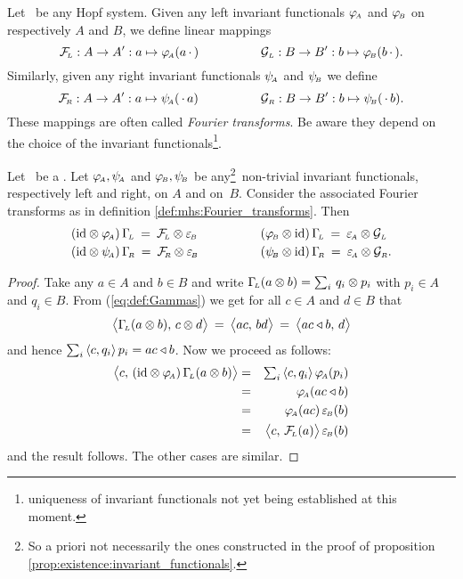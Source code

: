 \begin{defn_sec} \label{def:mhs:Fourier_transforms}
Let \pairAB\ be any Hopf system. Given any left invariant functionals
$\varphi_{\!\scriptscriptstyle A}$ and $\varphi_{\scriptscriptstyle \! B}$ on respectively $A$ and $B$, we define linear mappings
$$  \mathcal{F}_{\!\scriptscriptstyle L} : A \rightarrow A' :  a \mapsto \varphi_{\!\scriptscriptstyle A}(a\, \cdot \,)
        \hspace{5em}
    \mathcal{G}_{\scriptscriptstyle L} : B \rightarrow B' :  b \mapsto \varphi_{\scriptscriptstyle \! B}(b\, \cdot \,). $$
Similarly, given any right invariant functionals $\psi_{\!\scriptscriptstyle A}$ and $\psi_{\scriptscriptstyle \! B}$ we define
$$  \mathcal{F}_{\!\scriptscriptstyle R} : A \rightarrow A' :  a \mapsto \psi_{\!\scriptscriptstyle A}(\, \cdot \, a)
        \hspace{5em}
    \mathcal{G}_{\scriptscriptstyle R} : B \rightarrow B' :  b \mapsto \psi_{\scriptscriptstyle \! B}(\, \cdot \, b). $$
These mappings are often called {\em Fourier transforms}\@.
Be aware they depend on the choice of the invariant
functionals\footnote{uniqueness of invariant functionals not yet being
established at this moment.}.
\end{defn_sec}



\begin{lemma_sec} \label{lemma:mhs:Fourier_transforms}
Let\/ \pairAB\ be a \mhs\@. Let\/ $\varphi_{\!\scriptscriptstyle A}, \psi_{\!\scriptscriptstyle A}$ and\/ $\varphi_{\scriptscriptstyle \! B}, \psi_{\scriptscriptstyle \! B}$ be
any\footnote{So a priori not necessarily the ones constructed in
the proof of proposition \ref{prop:existence:invariant_functionals}.}\
non-trivial invariant functionals, respectively left and right, on $A$ and \mbox{on\/ $B$}\@.
Consider the associated Fourier transforms as in definition
\ref{def:mhs:Fourier_transforms}\@. Then
$$\begin{array}{lll}
    (\id \tens \phiA)\, \GamL \:=\: \FL \tens \epsB   & \hspace{3em} &
    (\phiB \tens \id)\, \GamL \:=\: \epsA \tens \GL
  \\
    (\id \tens \psiA)\, \GamR \:=\: \FR \tens \epsB   & \vertL &
    (\psiB \tens \id)\, \GamR \:=\: \epsA \tens \GR.
  \end{array}$$
\end{lemma_sec}

\begin{proof}
Take any $a \in A$ and $b\in B$ and write
$\Gamma_{\!\scriptscriptstyle L}(a \otimes b) = \sum_i \,q_i \otimes p_i$ with $p_i \in A$ and $q_i \in B$.
From (\ref{eq:def:Gammas}) we get for all $c \in A$ and $d\in B$ that
$$ \pairM{\GamL(a \tens b)}{c \tens d} \:=\: \pairM{ac}{bd} \:=\: \pairM{ac \ract b}{d}   $$
and hence $\sum_i \,\langle c,q_i \rangle \, p_i = ac \triangleleft b$. Now we proceed as follows:
\begin{eqnarray*}
\pairM{c}{(\id \tens \phiA)\, \GamL(a \tens b)}
  &=&
\textstyle \sum_i \,\pair{c}{q_i} \, \phiA(p_i)
\\&=&
\phiA(ac \ract b)
\\&=&
\phiA(ac) \,\epsB(b)
\\&=&
\pairM{c}{\FL(a)}  \epsB(b)
\end{eqnarray*}
and the result follows. The other cases are similar.
\end{proof}


